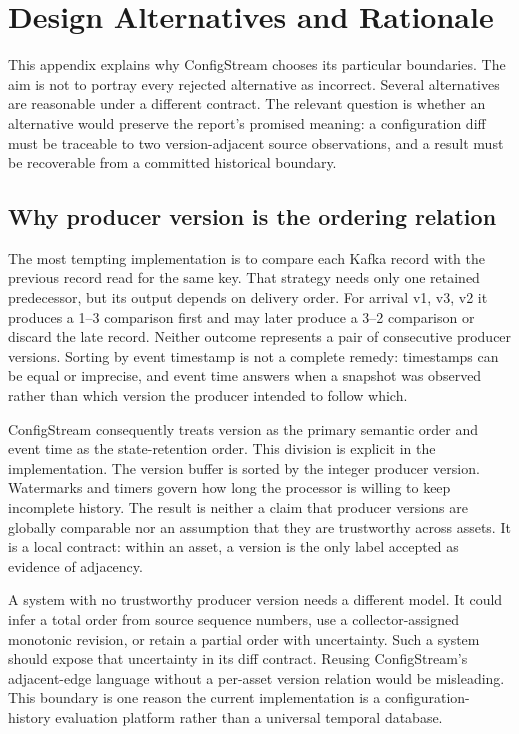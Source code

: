 \documentclass[a4paper,11pt]{article}
\begin{document}
\section{Design Alternatives and Rationale}
\label{app:design-rationale}

This appendix explains why ConfigStream chooses its particular boundaries. The aim is not to portray every rejected alternative as incorrect. Several alternatives are reasonable under a different contract. The relevant question is whether an alternative would preserve the report's promised meaning: a configuration diff must be traceable to two version-adjacent source observations, and a result must be recoverable from a committed historical boundary.

\subsection{Why producer version is the ordering relation}

The most tempting implementation is to compare each Kafka record with the previous record read for the same key. That strategy needs only one retained predecessor, but its output depends on delivery order. For arrival v1, v3, v2 it produces a 1--3 comparison first and may later produce a 3--2 comparison or discard the late record. Neither outcome represents a pair of consecutive producer versions. Sorting by event timestamp is not a complete remedy: timestamps can be equal or imprecise, and event time answers when a snapshot was observed rather than which version the producer intended to follow which.

ConfigStream consequently treats version as the primary semantic order and event time as the state-retention order. This division is explicit in the implementation. The version buffer is sorted by the integer producer version. Watermarks and timers govern how long the processor is willing to keep incomplete history. The result is neither a claim that producer versions are globally comparable nor an assumption that they are trustworthy across assets. It is a local contract: within an asset, a version is the only label accepted as evidence of adjacency.

A system with no trustworthy producer version needs a different model. It could infer a total order from source sequence numbers, use a collector-assigned monotonic revision, or retain a partial order with uncertainty. Such a system should expose that uncertainty in its diff contract. Reusing ConfigStream's adjacent-edge language without a per-asset version relation would be misleading. This boundary is one reason the current implementation is a configuration-history evaluation platform rather than a universal temporal database.
\end{document}
